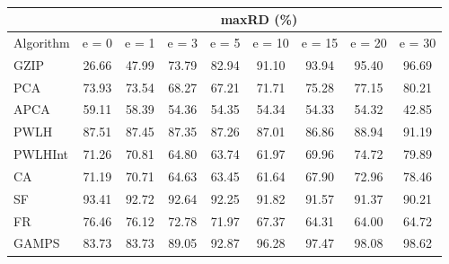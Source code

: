 \begin{table}[h]
\newcommand{\cpca}{\cellcolor{cyan!20}}
\newcommand{\capca}{\cellcolor{green!20}}
\newcommand{\cfr}{\cellcolor{yellow!25}}
\newcommand{\cgzip}{\cellcolor{orange!20}}
\newcommand{\cca}{\cellcolor{violet!20}}
\newcommand{\best}{\cellcolor{gray!30}}
\centering\hspace*{0cm}\begin{tabular}{| l | c | c | c | c | c | c | c | c |}\cline{2-9}\multicolumn{1}{c|}{}& \multicolumn{8}{c|}{maxRD (\%)}\\\hline
{Algorithm} & {e = 0} & {e = 1} & {e = 3} & {e = 5} & {e = 10} & {e = 15} & {e = 20} & {e = 30} \\\hline
{GZIP\cgzip} & {\best26.66} & {\best47.99} & {73.79} & {82.94} & {91.10} & {93.94} & {95.40} & {96.69} \\\hline
{PCA\cpca} & {73.93} & {73.54} & {68.27} & {67.21} & {71.71} & {75.28} & {77.15} & {80.21} \\\hline
{APCA\capca} & {59.11} & {58.39} & {\best54.36} & {\best54.35} & {\best54.34} & {\best54.33} & {\best54.32} & {\best42.85} \\\hline
{PWLH} & {87.51} & {87.45} & {87.35} & {87.26} & {87.01} & {86.86} & {88.94} & {91.19} \\\hline
{PWLHInt} & {71.26} & {70.81} & {64.80} & {63.74} & {61.97} & {69.96} & {74.72} & {79.89} \\\hline
{CA\cca} & {71.19} & {70.71} & {64.63} & {63.45} & {61.64} & {67.90} & {72.96} & {78.46} \\\hline
{SF} & {93.41} & {92.72} & {92.64} & {92.25} & {91.82} & {91.57} & {91.37} & {90.21} \\\hline
{FR\cfr} & {76.46} & {76.12} & {72.78} & {71.97} & {67.37} & {64.31} & {64.00} & {64.72} \\\hline
{GAMPS} & {83.73} & {83.73} & {89.05} & {92.87} & {96.28} & {97.47} & {98.08} & {98.62} \\\hline
\end{tabular}
\caption{\captionminmaxtwo}
\label{experiments:minmaxtwo}
\end{table}
